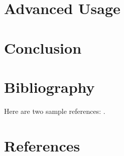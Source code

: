 \section{Advanced Usage}%
\label{sec:advanced_usage}

\section{Conclusion}%
\label{sec:conclusion}


\section{Bibliography}

Here are two sample references: \cite{Feynman1963118,Dirac1953888}.

\section*{References}




